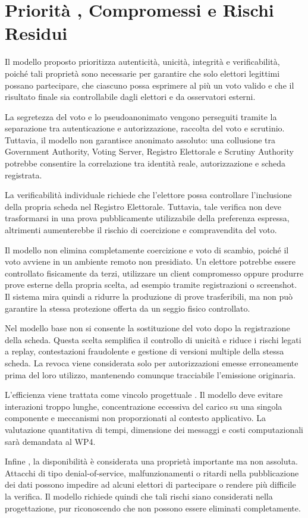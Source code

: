 \documentclass[a4paper,12pt]{article}
\begin{document}
\section{Priorità , Compromessi e Rischi Residui}

Il modello proposto prioritizza autenticità, unicità, integrità e verificabilità, poiché tali proprietà sono necessarie per garantire che solo elettori legittimi possano partecipare, che ciascuno possa esprimere al più un voto valido e che il risultato finale sia controllabile dagli elettori e da osservatori esterni.

La segretezza del voto e lo pseudoanonimato vengono perseguiti tramite la separazione tra autenticazione e autorizzazione, raccolta del voto e scrutinio. Tuttavia, il modello non garantisce anonimato assoluto: una collusione tra Government Authority, Voting Server, Registro Elettorale e Scrutiny Authority potrebbe consentire la correlazione tra identità reale, autorizzazione e scheda registrata.

La verificabilità individuale richiede che l'elettore possa controllare l'inclusione della propria scheda nel Registro Elettorale. Tuttavia, tale verifica non deve trasformarsi in una prova pubblicamente utilizzabile della preferenza espressa, altrimenti aumenterebbe il rischio di coercizione e compravendita del voto.

Il modello non elimina completamente coercizione e voto di scambio, poiché il voto avviene in un ambiente remoto non presidiato. Un elettore potrebbe essere controllato fisicamente da terzi, utilizzare un client compromesso oppure produrre prove esterne della propria scelta, ad esempio tramite registrazioni o screenshot. Il sistema mira quindi a ridurre la produzione di prove trasferibili, ma non può garantire la stessa protezione offerta da un seggio fisico controllato.

Nel modello base non si consente la sostituzione del voto dopo la registrazione della scheda. Questa scelta semplifica il controllo di unicità e riduce i rischi legati a replay, contestazioni fraudolente e gestione di versioni multiple della stessa scheda. La revoca viene considerata solo per autorizzazioni emesse erroneamente prima del loro utilizzo, mantenendo comunque tracciabile l'emissione originaria.

L'efficienza viene trattata come vincolo progettuale . Il modello deve evitare interazioni troppo lunghe, concentrazione eccessiva del carico su una singola componente e meccanismi non proporzionati al contesto applicativo. La valutazione quantitativa di tempi, dimensione dei messaggi e costi computazionali sarà demandata al WP4.

Infine , la disponibilità è considerata una proprietà importante ma non assoluta. Attacchi di tipo denial-of-service,
malfunzionamenti o ritardi nella pubblicazione dei dati possono impedire ad alcuni elettori di partecipare o rendere
più difficile la verifica. Il modello richiede quindi che tali rischi siano considerati nella progettazione, pur riconoscendo
che non possono essere eliminati completamente.

    
\end{document}
